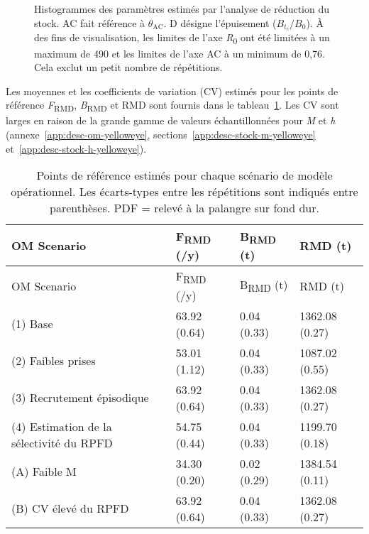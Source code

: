 \documentclass[french,11pt]{book}
\begin{document}
\begin{figure}[htb]

{\centering {} 

}

\caption{Histogrammes des paramètres estimés par l'analyse de réduction du stock. AC fait référence à \(\theta_\textrm{AC}\). D désigne l'épuisement (\(B_{t_c}/B_0\)). À des fins de visualisation, les limites de l'axe \emph{R}\textsubscript{0} ont été limitées à un maximum de 490 et les limites de l'axe AC à un minimum de 0,76. Cela exclut un petit nombre de répétitions.}\label{fig:sra-conditioned-parameters}
\end{figure}
Les moyennes et les coefficients de variation (CV) estimés pour les points de référence \emph{F}\textsubscript{RMD}, \emph{B}\textsubscript{RMD} et RMD sont fournis dans le tableau~\ref{tab:sra-ref-pts}. Les CV sont larges en raison de la grande gamme de valeurs échantillonnées pour \emph{M} et \emph{h} (annexe~\ref{app:desc-om-yelloweye}, sections~\ref{app:desc-stock-m-yelloweye} et~\ref{app:desc-stock-h-yelloweye}).
\begin{longtable}[]{@{}llll@{}}
\caption{\label{tab:sra-ref-pts}Points de référence estimés pour chaque scénario de modèle opérationnel. Les écarts-types entre les répétitions sont indiqués entre parenthèses. PDF = relevé à la palangre sur fond dur.}\tabularnewline
\toprule
OM Scenario & F\textsubscript{RMD} (/y) & B\textsubscript{RMD} (t) & RMD (t) \\
\midrule
\endfirsthead
\toprule
OM Scenario & F\textsubscript{RMD} (/y) & B\textsubscript{RMD} (t) & RMD (t) \\
\midrule
\endhead
(1) Base & 63.92 (0.64) & 0.04 (0.33) & 1362.08 (0.27) \\
(2) Faibles prises & 53.01 (1.12) & 0.04 (0.33) & 1087.02 (0.55) \\
(3) Recrutement épisodique & 63.92 (0.64) & 0.04 (0.33) & 1362.08 (0.27) \\
(4) Estimation de la sélectivité du RPFD & 54.75 (0.44) & 0.04 (0.33) & 1199.70 (0.18) \\
(A) Faible M & 34.30 (0.20) & 0.02 (0.29) & 1384.54 (0.11) \\
(B) CV élevé du RPFD & 63.92 (0.64) & 0.04 (0.33) & 1362.08 (0.27) \\
\bottomrule
\end{longtable}
\clearpage
\end{document}
